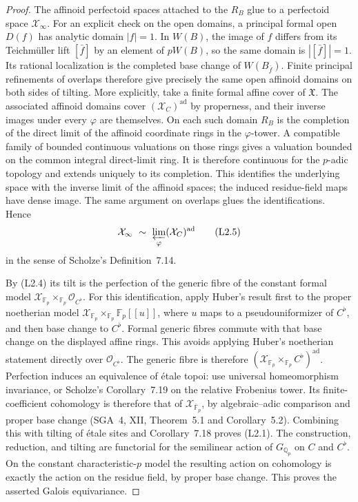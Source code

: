 \begin{proof}
The affinoid perfectoid spaces attached to the $R_B$ glue to a
perfectoid space $\mathcal X_\infty$.  For an explicit check on the
open domains, a principal formal open $D(f)$ has analytic domain
$|f|=1$.  In $W(B)$, the image of $f$ differs from its Teichm\"uller
lift $[\bar f]$ by an element of $pW(B)$, so the same domain is
$|[\bar f]|=1$.  Its rational localization is the completed base
change of $W(B_{\bar f})$.  Finite principal refinements of overlaps
therefore give precisely the same open affinoid domains on both
sides of tilting.  More explicitly, take a finite
formal affine cover of $\mathfrak X$.  The associated affinoid domains
cover $(\mathcal X_C)^{\mathrm{ad}}$ by properness, and their inverse
images under every $\varphi$ are themselves.  On each such domain
$R_B$ is the completion of the direct limit of the affinoid coordinate
rings in the $\varphi$-tower.  A compatible family of bounded
continuous valuations on those rings gives a valuation bounded on
the common integral direct-limit ring.  It is therefore continuous
for the $p$-adic topology and extends uniquely to its completion.  This identifies
the underlying space with the inverse limit of the affinoid spaces;
the induced residue-field maps have dense image.  The same argument
on overlaps glues the identifications.  Hence
\[
 \mathcal X_\infty\ \sim\
 \varprojlim_{\varphi}(\mathcal X_C)^{\mathrm{ad}}
 \tag{L2.5}
\]
in the sense of Scholze's Definition~7.14.

By (L2.4) its tilt is the perfection of the generic fibre of the
constant formal model
$\mathcal X_{\mathbb F_p}\times_{\mathbb F_p}\mathcal O_{C^\flat}$.
For this identification, apply Huber's result first to the
proper noetherian model
$\mathcal X_{\mathbb F_p}\times_{\mathbb F_p}\mathbb F_p[[u]]$,
where $u$ maps to a pseudouniformizer of $C^\flat$, and then base change
to $C^\flat$.  Formal generic fibres commute with that base change on
the displayed affine rings.  This avoids applying Huber's noetherian
statement directly over $\mathcal O_{C^\flat}$.  The generic fibre is
therefore
$(\mathcal X_{\mathbb F_p}\times_{\mathbb F_p}C^\flat)^{\mathrm{ad}}$.
Perfection induces an equivalence of \'etale topoi: use universal
homeomorphism invariance, or Scholze's Corollary~7.19 on the relative
Frobenius tower.  Its finite-coefficient cohomology is therefore that
of $\mathcal X_{\overline{\mathbb F}_p}$, by algebraic--adic comparison
and proper base change (SGA~4, XII, Theorem~5.1 and Corollary~5.2).
Combining this with tilting of \'etale sites and Corollary~7.18 proves
(L2.1).  The construction, reduction, and tilting are functorial for
the semilinear action of $G_{\mathbb Q_p}$ on $C$ and $C^\flat$.
On the constant characteristic-$p$ model the resulting action on
cohomology is exactly the action on the residue field, by proper base
change.  This proves the asserted Galois equivariance.


\end{proof}
